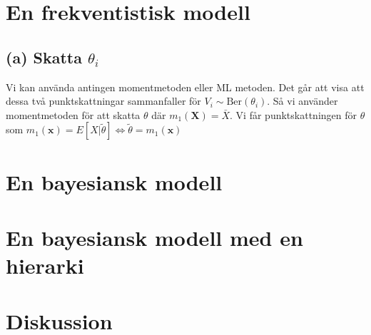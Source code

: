 \documentclass{assignment}
\begin{document}
\section{En frekventistisk modell}
\subsection*{(a) Skatta $\theta_{i}$}
Vi kan använda antingen momentmetoden eller ML metoden. Det går att visa att dessa två punktskattningar sammanfaller för $V_i \sim \text{Ber}(\theta_i)$.
Så vi använder momentmetoden för att skatta $\theta$ där
$m_1(\mathbf{X}) = \bar{X}$. Vi får punktskattningen för $\theta$ som
$m_1(\mathbf{x})= E[X|\tilde{\theta}] \Leftrightarrow \tilde{\theta} = m_1(\mathbf{x})$
\section{En bayesiansk modell}
\section{En bayesiansk modell med en hierarki}
\section{Diskussion}

%  
\end{document}
